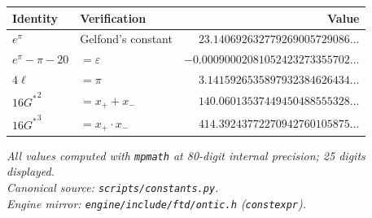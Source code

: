 \documentclass[11pt,a4paper]{article}
\newcommand{\Gstar}{{G^{*}}}
\begin{document}
\begin{longtable}{lp{5.5cm}r}
\toprule
\textbf{Identity} & \textbf{Verification} & \textbf{Value} \\
\midrule
\endhead
$e^\pi$ & Gelfond's constant &
$23.140692632779269005729086\ldots$ \\[4pt]
$e^\pi - \pi - 20$ & $= \varepsilon$ &
$-0.00090002081052423273355702\ldots$ \\[4pt]
$4\ell$ & $= \pi$ &
$3.1415926535897932384626434\ldots$ \\[4pt]
$16\Gstar^2$ & $= x_+ + x_-$ &
$140.06013537449450488555328\ldots$ \\[4pt]
$16\Gstar^3$ & $= x_+ \cdot x_-$ &
$414.39243772270942760105875\ldots$ \\
\bottomrule
\end{longtable}

\bigskip

\begin{center}\itshape
All values computed with \texttt{mpmath} at 80-digit internal precision; 25 digits displayed.\\
Canonical source: \texttt{scripts/constants.py}.\\
Engine mirror: \texttt{engine/include/ftd/ontic.h} (\texttt{constexpr}).
\end{center}
\end{document}
